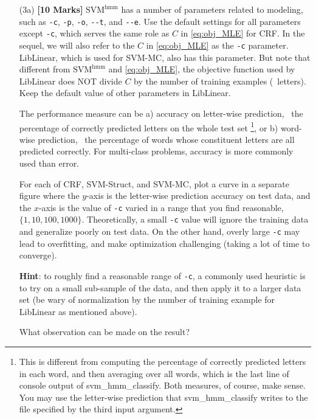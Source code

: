 \documentclass[11pt]{report}
\begin{document}
	
	\begin{itemize}
		\item[(3a)] {\bf [10 Marks]} $\text{SVM}^{\text{hmm}}$ has a number of parameters related to modeling, such as \verb#-c#, \verb#-p#, \verb#-o#, \verb#--t#, and \verb#--e#.
		Use the default settings for all parameters except \verb#-c#,
		which serves the same role as $C$ in \eqref{eq:obj_MLE} for CRF.
		In the sequel, we will also refer to the $C$ in \eqref{eq:obj_MLE} as the \verb#-c# parameter.
		LibLinear, which is used for SVM-MC, also has this parameter.
		But note that different from $\text{SVM}^{\text{hmm}}$ and \eqref{eq:obj_MLE}, the objective function used by LibLinear does NOT divide $C$ by the number of training examples (\ie\ letters).
		Keep the default value of other parameters in LibLinear.
		
		The performance measure can be a) accuracy on letter-wise prediction, \ie\ the percentage of correctly predicted letters on the whole test set%
		\footnote{This is different from computing the percentage of correctly predicted letters in each word, and then averaging over all words, which is the last line of console output of \textsf{svm\_hmm\_classify}.  Both measures, of course, make sense.
			You may use the letter-wise prediction that \textsf{svm\_hmm\_classify} writes to the file specified by the third input argument.},
		or b) word-wise prediction, \ie\ the percentage of words whose constituent letters are all predicted correctly.
		For multi-class problems, accuracy is more commonly used than error.
		
		For each of CRF, SVM-Struct, and SVM-MC,
		plot a curve in a separate figure where the $y$-axis is the letter-wise prediction accuracy on test data,
		and the $x$-axis is the value of \verb#-c# varied in a range that you find reasonable,
		\eg\ $\{1, 10, 100, 1000\}$.
		Theoretically, a small \verb#-c# value will ignore the training data and generalize poorly on test data.
		On the other hand, overly large \verb#-c# may lead to overfitting, and make optimization challenging (taking a lot of time to converge).
		
		\textbf{Hint}: to roughly find a reasonable range of \verb#-c#, a commonly used heuristic is to try on a small sub-sample of the data, and then apply it to a larger data set (be wary of normalization by the number of training example for LibLinear as mentioned above).
		
		What observation can be made on the result?
		

\end{itemize}
\end{document}
